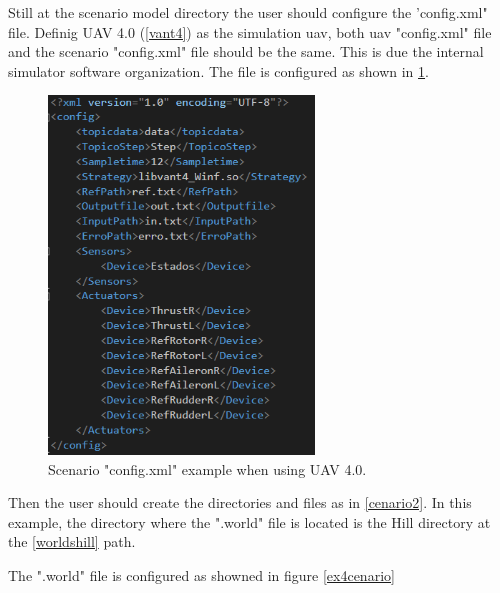 Still at the scenario model directory the user should configure the 'config.xml" file. Definig UAV 4.0 (\ref{vant4}) as the simulation uav, both uav "config.xml" file and the scenario "config.xml" file should be the same. This is due the internal simulator software organization. The file is configured as shown in \ref{ex3cenario}.

			\begin{figure}[!ht]
	\centering
	\includegraphics[width=200pt]{figuras/ex3cenario.png}
	\caption{Scenario "config.xml" example when using UAV 4.0.}
	\label{ex3cenario}
\end{figure}

Then the user should create the directories and files as in \ref{cenario2}. In this example, the directory where the ".world" file is located is the Hill directory at the \ref{worldshill} path.


\label{worldshill}

The ".world" file is configured as showned in figure \ref{ex4cenario}

